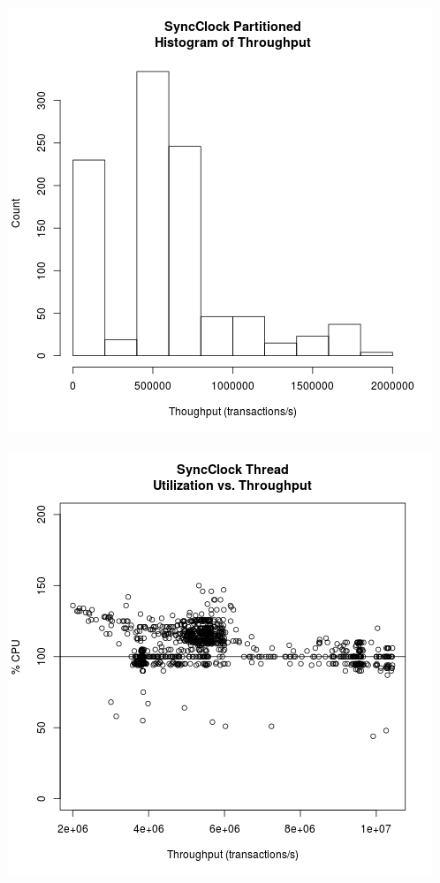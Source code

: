 \begin{figure}
\center
\includegraphics[height=.25\textheight]{sync_partitioned_throughput_hist.png}
\caption{\label{sync_partitioned_throughput}}
\end{figure}

\clearpage

\begin{figure}
\center
\includegraphics[height=.25\textheight]{sync_thread_throughput_utilization.png}
\caption{\label{sync_thread_throughput_utilization}}
\end{figure}

